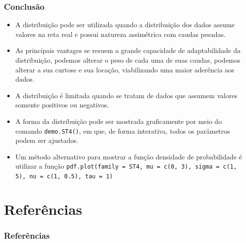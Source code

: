 \documentclass[13pt, aspectratio=169]{beamer}
\begin{document}
\begin{frame}
    \frametitle{Conclusão}

    \begin{itemize}
        \item A distribuição pode ser utilizada quando a distribuição dos dados assume valores na reta real e possui natureza assimétrica com caudas pesadas.
        \pause
        \item As principais vantages se resuem a grande capacidade de adaptabilidade da distribuição, podemos alterar o peso de cada uma de suas caudas, podemos alterar a sua curtose e sua locação, viabilizando uma maior aderência aos dados.
        \pause
        \item A distribuição é limitada quando se tratam de dados que assumem valores somente positivos ou negativos.
        \pause
        \item A forma da distribuição pode ser mostrada graficamente por meio do comando \texttt{demo.ST4()}, em que, de forma interativa, todos os parâmetros podem ser ajustados.
        \pause
        \item Um método alternativo para mostrar a função densidade de probabilidade é utilizar a função \texttt{pdf.plot(family = ST4, mu = c(0, 3), sigma = c(1, 5), nu = c(1, 0.5), tau = 1)}
    \end{itemize}

\end{frame}

\section{Referências}

\begin{frame}
    \frametitle{Referências}

    \printbibliography{}

\end{frame}
\end{document}
